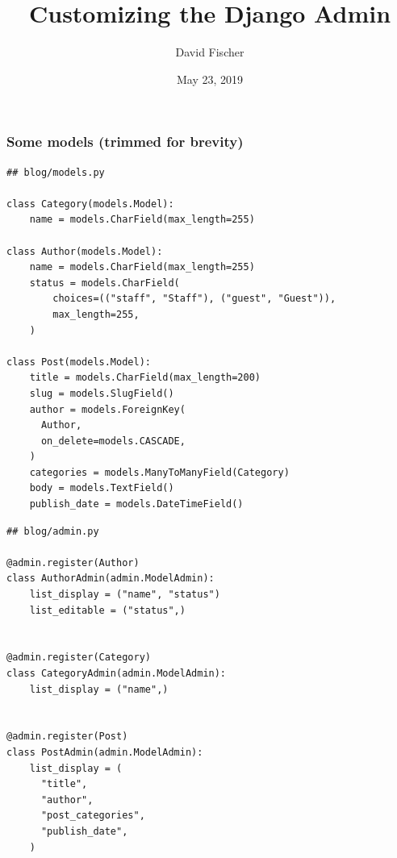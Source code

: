 \documentclass[aspectratio=169]{beamer}
\title{Customizing the Django Admin}
\author{David Fischer}
\date{May 23, 2019}
\begin{document}
\maketitle


\begin{frame}[fragile]
\frametitle{Some models (trimmed for brevity)}

\begin{multicols}{2}

{\tiny
\begin{verbatim}
## blog/models.py

class Category(models.Model):
    name = models.CharField(max_length=255)

class Author(models.Model):
    name = models.CharField(max_length=255)
    status = models.CharField(
        choices=(("staff", "Staff"), ("guest", "Guest")),
        max_length=255,
    )

class Post(models.Model):
    title = models.CharField(max_length=200)
    slug = models.SlugField()
    author = models.ForeignKey(
      Author, 
      on_delete=models.CASCADE,
    )
    categories = models.ManyToManyField(Category)
    body = models.TextField()
    publish_date = models.DateTimeField()
\end{verbatim}
} 

\columnbreak

{\tiny
\begin{verbatim}
## blog/admin.py

@admin.register(Author)
class AuthorAdmin(admin.ModelAdmin):
    list_display = ("name", "status")
    list_editable = ("status",)


@admin.register(Category)
class CategoryAdmin(admin.ModelAdmin):
    list_display = ("name",)


@admin.register(Post)
class PostAdmin(admin.ModelAdmin):
    list_display = (
      "title", 
      "author", 
      "post_categories", 
      "publish_date",
    )
\end{verbatim}
}

\end{multicols}

\end{frame}


\begin{frame}
  \begin{figure}[p]
    \centering
  \end{figure}
\end{frame}
\end{document}
